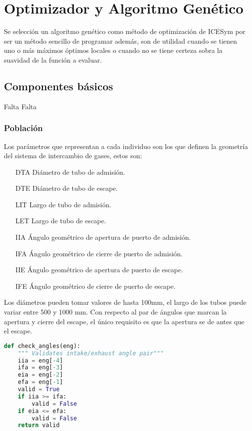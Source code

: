 \section{Optimizador y Algoritmo Genético}
%
Se selección un algoritmo genético como método de optimización de ICESym por
ser un método sencillo de programar además, son de utilidad cuando se tienen uno
o más máximos óptimos locales o cuando no se tiene certeza sobra la suavidad de
la función a evaluar.



\subsection{Componentes básicos}
%
Falta
%
%
Falta
%
\subsubsection{Población}
%
Los parámetros que representan a cada individuo son los que definen la geometría
del sistema de intercambio de gases, estos son:

\begin{enumerate}
    \item [DTA] Diámetro de tubo de admisión.
    \item [DTE] Diámetro de tubo de escape.
    \item [LIT] Largo de tubo de admisión.
    \item [LET] Largo de tubo de escape.
    \item [IIA] Ángulo geométrico de apertura de puerto de admisión.
    \item [IFA] Ángulo geométrico de cierre de puerto de admisión.
    \item [IIE] Ángulo geométrico de apertura de puerto de escape.
    \item [IFE] Ángulo geométrico de cierre de puerto de escape.
\end{enumerate}

Los diámetros pueden tomar valores de hasta 100mm, el largo de los tubos puede
variar entre 500 y 1000 mm.
%
Con respecto al par de ángulos que marcan la apertura y cierre del escape,
el único requisito es que la apertura se de antes que el escape.

\begin{lstlisting}[language=Python]
def check_angles(eng):
    """ Validates intake/exhaust angle pair"""
    iia = eng[-4]
    ifa = eng[-3]
    eia = eng[-2]
    efa = eng[-1]
    valid = True
    if iia >= ifa:
        valid = False
    if eia <= efa:
        valid = False
    return valid
\end{lstlisting}

